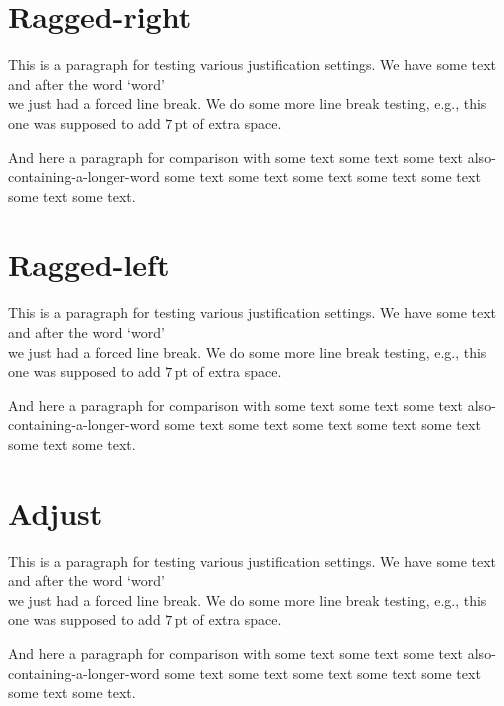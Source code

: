 \documentclass{article}
\begin{document}
\section{Ragged-right}

This is a paragraph for testing various justification settings. We have some
text and after the word `word' \\ we just had a forced line break. We
do some more line break testing, e.g., this\\[7pt] one was supposed to
add $7$\,pt of extra space.

And here a paragraph for comparison with some text some text some text
also-containing-a-longer-word some text some text some text some text
some text some text some text.

\section{Ragged-left}

\sloppy
This is a paragraph for testing various justification settings. We have some
text and after the word `word' \\ we just had a forced line break. We
do some more line break testing, e.g., this\\[7pt] one was supposed to
add $7$\,pt of extra space.

And here a paragraph for comparison with some text some text some text
also-containing-a-longer-word some text some text some text some text
some text some text some text.

\section{Adjust}

\fussy
This is a paragraph for testing various justification settings. We have some
text and after the word `word' \\ we just had a forced line break. We
do some more line break testing, e.g., this\\[7pt] one was supposed to
add $7$\,pt of extra space.

And here a paragraph for comparison with some text some text some text
also-containing-a-longer-word some text some text some text some text
some text some text some text.
\end{document}
